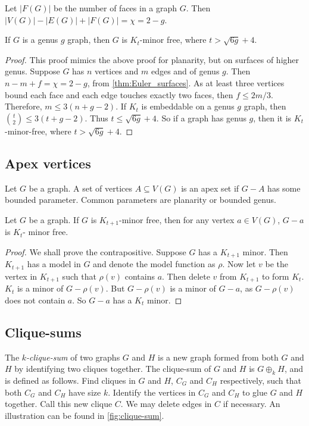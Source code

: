 \begin{theorem}\label{thm:Euler_surfaces}
	Let \(|F(G)|\) be the number of faces in a graph \(G\). Then \(|V(G)| - |E(G)| + |F(G)| = \chi = 2 - g\). 
\end{theorem}

\begin{theorem}\label{thm:bounded_genus_kt_free}
	If \(G\) is a genus \(g\) graph, then \(G\) is \(K_t\)-minor free, where \(t > \sqrt{6g} + 4\). 
\end{theorem}
\begin{proof}
	This proof mimics the above proof for planarity, but on surfaces of higher genus. 
	Suppose \(G\) has \(n\) vertices and \(m\) edges and of genus $g$. Then \(n - m + f = \chi = 2-g\), from \cref{thm:Euler_surfaces}. As at least three vertices bound each face and each edge touches exactly two faces, then \(f \leq 2m/3\). Therefore, \(m \leq 3(n + g - 2)\). If \(K_t\) is embeddable on a genus \(g\) graph, then \(\binom{t}{2} \leq 3 (t + g - 2)\). Thus \(t \leq \sqrt{6g} + 4\). So if a graph has genus \(g\), then it is \(K_t\)-minor-free, where \(t > \sqrt{6g} + 4\). 
\end{proof}

\subsection{Apex vertices}\label{sssec:Apex_Vertices}
Let $G$ be a graph. A set of vertices $A \subseteq V(G)$ is an apex set if $G - A$ has some bounded parameter. Common parameters are planarity or bounded genus. 
\begin{theorem}
	Let $G$ be a graph. If \(G\) is \(K_{t + 1}\)-minor free, then for any vertex $a \in V(G)$, $G - a$ is \(K_t\)- minor free. 
\end{theorem}
\begin{proof}
	We shall prove the contrapositive. Suppose \(G\) has a \(K_{t + 1}\) minor. Then \(K_{t + 1}\) has a model in \(G\) and denote the model function as \(\rho\). Now let \(v\) be the vertex in \(K_{t + 1}\) such that \(\rho(v)\) contains \(a\). Then delete \(v\) from \(K_{t + 1}\) to form $K_t$. \(K_t\) is a minor of \(G - \rho(v)\). But \(G - \rho(v)\) is a minor of \(G - a\), as \(G - \rho(v)\) does not contain \(a\). So \(G - a\) has a \(K_t\) minor. 
\end{proof}
\subsection{Clique-sums}\label{sssec:Clique_Sums}
The \textit{\(k\)-clique-sum} of two graphs \(G\) and \(H\) is a new graph formed from both $G$ and $H$ by identifying two cliques together. The clique-sum of $G$ and $H$ is \(G \oplus_k H\), and is defined as follows. Find cliques in \(G\) and \(H\), \(C_G\) and \(C_H\) respectively, such that both \(C_G\) and \(C_H\) have size \(k\). Identify the vertices in \(C_G\) and \(C_H\) to glue \(G\) and \(H\) together. Call this new clique \(C\). We may delete edges in $C$ if necessary. An illustration can be found in \cref{fig:clique-sum}. 

